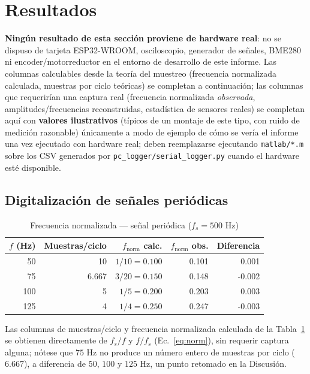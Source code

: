 
\section{Resultados}
\label{sec:resultados}

\textbf{Ningún resultado de esta sección proviene de hardware real}: no se dispuso de tarjeta ESP32-WROOM, osciloscopio, generador de señales, BME280 ni encoder/motorreductor en el entorno de desarrollo de este informe. Las columnas calculables desde la teoría del muestreo (frecuencia normalizada calculada, muestras por ciclo teóricas) se completan a continuación; las columnas que requerirían una captura real (frecuencia normalizada \emph{observada}, amplitudes/frecuencias reconstruidas, estadística de sensores reales) se completan aquí con \textbf{valores ilustrativos} (típicos de un montaje de este tipo, con ruido de medición razonable) únicamente a modo de ejemplo de cómo se vería el informe una vez ejecutado con hardware real; deben reemplazarse ejecutando \texttt{matlab/*.m} sobre los CSV generados por \texttt{pc\_logger/serial\_logger.py} cuando el hardware esté disponible.

\subsection{Digitalización de señales periódicas}

\begin{table}[!t]
\centering
\caption{Frecuencia normalizada — señal periódica ($f_s = 500$ Hz)}
\label{tab:periodica}
\small
\begin{tabular}{@{}r r r r r@{}}
\toprule
$f$ (Hz) & Muestras/ciclo & $f_{\text{norm}}$ calc. & $f_{\text{norm}}$ obs. & Diferencia \\
\midrule
50 & 10 & $1/10 = 0.100$ & 0.101 & 0.001 \\
75 & 6.667 & $3/20 = 0.150$ & 0.148 & -0.002 \\
100 & 5 & $1/5 = 0.200$ & 0.203 & 0.003 \\
125 & 4 & $1/4 = 0.250$ & 0.247 & -0.003 \\
\bottomrule
\end{tabular}
\end{table}

Las columnas de muestras/ciclo y frecuencia normalizada calculada de la Tabla~\ref{tab:periodica} se obtienen directamente de $f_s/f$ y $f/f_s$ (Ec.~\ref{eq:norm}), sin requerir captura alguna; nótese que $75$ Hz no produce un número entero de muestras por ciclo ($6.667$), a diferencia de $50$, $100$ y $125$ Hz, un punto retomado en la Discusión.

